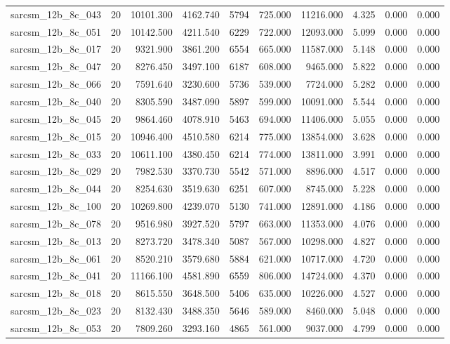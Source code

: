 \begin{tabular}{lrrrrrrrrr}
sarcsm\_12b\_8c\_043 & 20 & 10101.300 & 4162.740 & 5794 & 725.000 & 11216.000 & 4.325 & 0.000 & 0.000 \\
sarcsm\_12b\_8c\_051 & 20 & 10142.500 & 4211.540 & 6229 & 722.000 & 12093.000 & 5.099 & 0.000 & 0.000 \\
sarcsm\_12b\_8c\_017 & 20 & 9321.900 & 3861.200 & 6554 & 665.000 & 11587.000 & 5.148 & 0.000 & 0.000 \\
sarcsm\_12b\_8c\_047 & 20 & 8276.450 & 3497.100 & 6187 & 608.000 & 9465.000 & 5.822 & 0.000 & 0.000 \\
sarcsm\_12b\_8c\_066 & 20 & 7591.640 & 3230.600 & 5736 & 539.000 & 7724.000 & 5.282 & 0.000 & 0.000 \\
sarcsm\_12b\_8c\_040 & 20 & 8305.590 & 3487.090 & 5897 & 599.000 & 10091.000 & 5.544 & 0.000 & 0.000 \\
sarcsm\_12b\_8c\_045 & 20 & 9864.460 & 4078.910 & 5463 & 694.000 & 11406.000 & 5.055 & 0.000 & 0.000 \\
sarcsm\_12b\_8c\_015 & 20 & 10946.400 & 4510.580 & 6214 & 775.000 & 13854.000 & 3.628 & 0.000 & 0.000 \\
sarcsm\_12b\_8c\_033 & 20 & 10611.100 & 4380.450 & 6214 & 774.000 & 13811.000 & 3.991 & 0.000 & 0.000 \\
sarcsm\_12b\_8c\_029 & 20 & 7982.530 & 3370.730 & 5542 & 571.000 & 8896.000 & 4.517 & 0.000 & 0.000 \\
sarcsm\_12b\_8c\_044 & 20 & 8254.630 & 3519.630 & 6251 & 607.000 & 8745.000 & 5.228 & 0.000 & 0.000 \\
sarcsm\_12b\_8c\_100 & 20 & 10269.800 & 4239.070 & 5130 & 741.000 & 12891.000 & 4.186 & 0.000 & 0.000 \\
sarcsm\_12b\_8c\_078 & 20 & 9516.980 & 3927.520 & 5797 & 663.000 & 11353.000 & 4.076 & 0.000 & 0.000 \\
sarcsm\_12b\_8c\_013 & 20 & 8273.720 & 3478.340 & 5087 & 567.000 & 10298.000 & 4.827 & 0.000 & 0.000 \\
sarcsm\_12b\_8c\_061 & 20 & 8520.210 & 3579.680 & 5884 & 621.000 & 10717.000 & 4.720 & 0.000 & 0.000 \\
sarcsm\_12b\_8c\_041 & 20 & 11166.100 & 4581.890 & 6559 & 806.000 & 14724.000 & 4.370 & 0.000 & 0.000 \\
sarcsm\_12b\_8c\_018 & 20 & 8615.550 & 3648.500 & 5406 & 635.000 & 10226.000 & 4.527 & 0.000 & 0.000 \\
sarcsm\_12b\_8c\_023 & 20 & 8132.430 & 3488.350 & 5646 & 589.000 & 8460.000 & 5.048 & 0.000 & 0.000 \\
sarcsm\_12b\_8c\_053 & 20 & 7809.260 & 3293.160 & 4865 & 561.000 & 9037.000 & 4.799 & 0.000 & 0.000 \\

\end{tabular}
